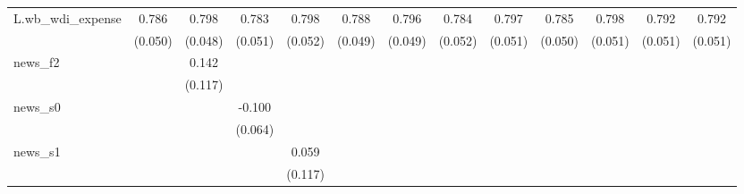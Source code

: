 {\begin{tabular}{l*{12}{c}}
\addlinespace
L.wb\_wdi\_expense&       0.786\sym{***}&       0.798\sym{***}&       0.783\sym{***}&       0.798\sym{***}&       0.788\sym{***}&       0.796\sym{***}&       0.784\sym{***}&       0.797\sym{***}&       0.785\sym{***}&       0.798\sym{***}&       0.792\sym{***}&       0.792\sym{***}\\
            &     (0.050)         &     (0.048)         &     (0.051)         &     (0.052)         &     (0.049)         &     (0.049)         &     (0.052)         &     (0.051)         &     (0.050)         &     (0.051)         &     (0.051)         &     (0.051)         \\
\addlinespace
news\_f2     &                     &       0.142         &                     &                     &                     &                     &                     &                     &                     &                     &                     &                     \\
            &                     &     (0.117)         &                     &                     &                     &                     &                     &                     &                     &                     &                     &                     \\
\addlinespace
news\_s0     &                     &                     &      -0.100         &                     &                     &                     &                     &                     &                     &                     &                     &                     \\
            &                     &                     &     (0.064)         &                     &                     &                     &                     &                     &                     &                     &                     &                     \\
\addlinespace
news\_s1     &                     &                     &                     &       0.059         &                     &                     &                     &                     &                     &                     &                     &                     \\
            &                     &                     &                     &     (0.117)         &                     &                     &                     &                     &                     &                     &                     &                     \\

\end{tabular}}
